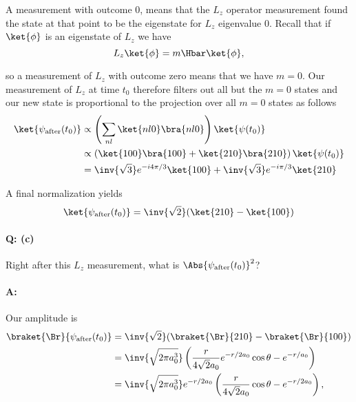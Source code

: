 {A measurement with outcome 0, means that the \(L_z\) operator measurement found the state at that point to be the eigenstate for \(L_z\) eigenvalue 0.  Recall that  if \(\ket{\phi}\) is an eigenstate of \(L_z\) we have
%
\begin{equation}\label{eqn:qmIexamPractice2007Dec:4:200}
L_z \ket{\phi} = m \Hbar \ket{\phi},
\end{equation}

so a measurement of \(L_z\) with outcome zero means that we have \(m=0\).  Our measurement of \(L_z\) at time \(t_0\) therefore filters out all but the \(m=0\) states and our new state is proportional to the projection over all \(m=0\) states as follows
%
\begin{equation}\label{eqn:qmIexamPractice2007Dec:510}
\begin{aligned}
\ket{\psi_{\text{after}}(t_0)}
&\propto \left( \sum_{n l} \ket{n l 0}\bra{n l 0} \right) \ket{\psi(t_0)}  \\
&\propto \left(
\ket{1 0 0}\bra{1 0 0}
+\ket{2 1 0}\bra{2 1 0}
\right) \ket{\psi(t_0)}  \\
&=
\inv{\sqrt{3}} e^{-i 4 \pi / 3} \ket{100}
+\inv{\sqrt{3}} e^{- i \pi / 3 } \ket{210}
\end{aligned}
\end{equation}

A final normalization yields
\begin{equation}\label{eqn:qmIexamPractice2007Dec:4:210}
\ket{\psi_{\text{after}}(t_0)}
= \inv{\sqrt{2}} (\ket{210} - \ket{100})
\end{equation}

\paragraph{Q: (c)}

Right after this \(L_z\) measurement, what is \(\Abs{\psi_{\text{after}}(t_0)}^2\)?

\paragraph{A:}

Our amplitude is
%
\begin{equation}\label{eqn:qmIexamPractice2007Dec:530}
\begin{aligned}
\braket{\Br}{\psi_{\text{after}}(t_0)}
&= \inv{\sqrt{2}} (\braket{\Br}{210} - \braket{\Br}{100}) \\
&= \inv{\sqrt{2 \pi a_0^3}}
\left(
\frac{r}{4\sqrt{2} a_0} e^{-r/2a_0} \cos\theta
-e^{-r/a_0}
\right) \\
&= \inv{\sqrt{2 \pi a_0^3}}
e^{-r/2 a_0}
\left(
\frac{r}{4\sqrt{2} a_0} \cos\theta
-e^{-r/2 a_0}
\right),
\end{aligned}
\end{equation}

}
